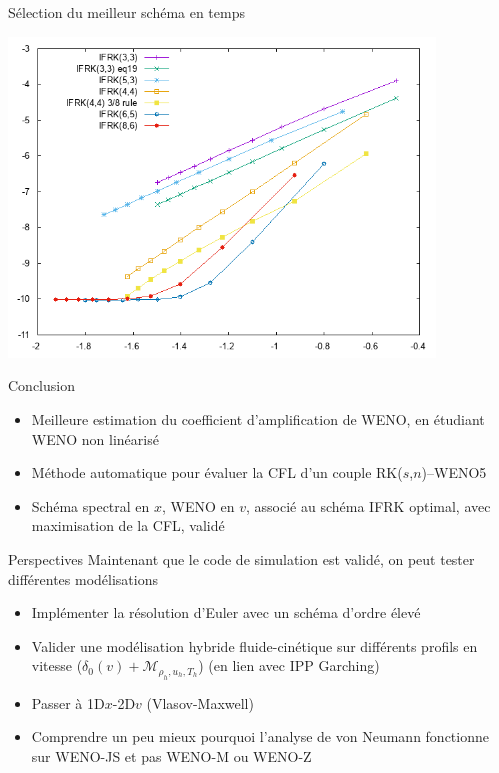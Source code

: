 \documentclass{beamer}
\begin{document}
\begin{frame}{Sélection du meilleur schéma en temps}
  \begin{center}
    \includegraphics[width=0.85\textwidth]{oHdt.png}
  \end{center}
\end{frame}

\begin{frame}{Conclusion}
  \begin{itemize}
    \item Meilleure estimation du coefficient d'amplification de WENO, en étudiant WENO non linéarisé
    \item Méthode automatique pour évaluer la CFL d'un couple RK($s$,$n$)--WENO5
    \item Schéma spectral en $x$, WENO en $v$, associé au schéma IFRK optimal, avec maximisation de la CFL, validé
  \end{itemize}
\end{frame}

\begin{frame}{Perspectives}
  Maintenant que le code de simulation est validé, on peut tester différentes modélisations
  \begin{itemize}
    \item Implémenter la résolution d'Euler avec un schéma d'ordre élevé
    \item Valider une modélisation hybride fluide-cinétique sur différents profils en vitesse ($\delta_{0}(v) + \mathcal{M}_{\rho_h,u_h,T_h}$) (en lien avec IPP Garching)
    \item Passer à 1D$x$-2D$v$ (Vlasov-Maxwell)
    \item Comprendre un peu mieux pourquoi l'analyse de von Neumann fonctionne sur WENO-JS et pas WENO-M ou WENO-Z
  \end{itemize}
\end{frame}
\end{document}

